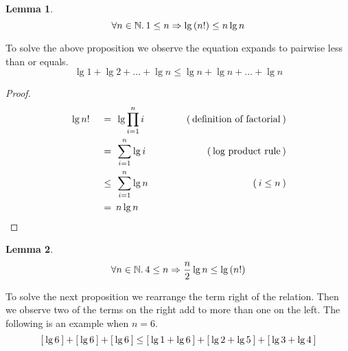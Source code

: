 \documentclass{article}
\newtheorem{lemma}{Lemma}
\theoremstyle{definition}
\newcommand{\evidence}[1]{\ensuremath{\hspace{3em} (\hspace{0.2em} \text{#1} \hspace{0.2em})}}
\newcommand{\relation}[1]{\ensuremath{\hspace{0.2em} {{} #1 {}} \hspace{0.2em}}}
\newcommand{\equal}{\relation{=}}
\newcommand{\lesseq}{\relation{\le}}
\newcommand{\parens}[1]{\left(#1\right)}
\newcommand{\brackets}[1]{\ensuremath{[ \hspace{0.2em} #1 \hspace{0.2em} ]}}
\newcommand{\quantify}[2]{\ensuremath{\forall #1 \in \mathbb{#2}. \hspace{0.2em}}}
\begin{document}
\begin{lemma}
  \begin{equation*}
    \quantify{n}{N} 1 \le n \Rightarrow \lg{\parens{n!}} \le n \lg{n}
  \end{equation*} 
\end{lemma}
\noindent
To solve the above proposition we observe the equation expands to pairwise less than or equals.
\begin{equation*}
  \lg{1} + \lg{2} + \dots + \lg{n} \le \lg{n} + \lg{n} + \dots + \lg{n}
\end{equation*} 
\begin{proof}
      
  \begin{alignat*}{4}
    & \lg{n!} & \equal  & \lg{\prod_{i=1}^{n}{i}}  & \evidence{definition of factorial} \\
    & {}      & \equal  & \sum_{i=1}^{n}{\lg{i}}   & \evidence{log product rule} \\
    & {}      & \lesseq & \sum_{i=1}^{n}{\lg{n}}   & \evidence{$i \le n$} \\  
    & {}      & \equal  & n \lg{n}                & \qedhere
  \end{alignat*}
\end{proof}

\begin{lemma}
  \begin{equation*}
    \quantify{n}{N} 4 \le n \Rightarrow \frac{n}{2} \lg{n} \le \lg{\parens{n!}}
  \end{equation*} 
\end{lemma} 
\noindent
To solve the next proposition we rearrange the term right of the relation.
Then we observe two of the terms on the right add to more than one on the left.
The following is an example when $n = 6$.
\begin{equation*}
  \brackets{\lg{6}} + \brackets{\lg{6}} + \brackets{\lg{6}} \le
  \brackets{\lg{1} + \lg{6}} + \brackets{\lg{2} + \lg{5}} + \brackets{\lg{3} + \lg{4}}
\end{equation*}
\end{document}
